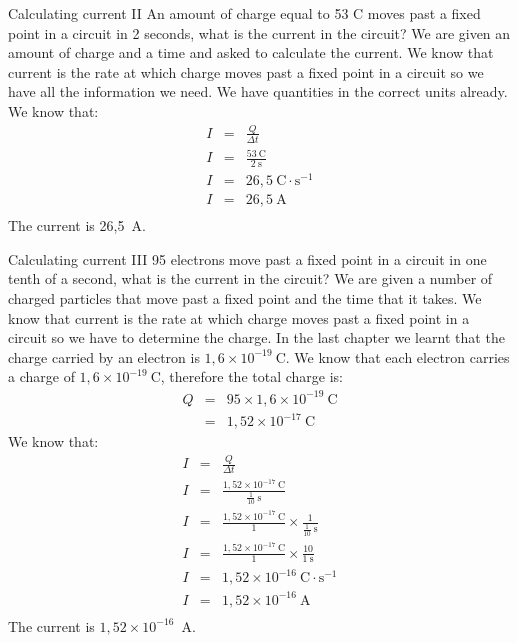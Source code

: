 \begin{wex}{Calculating current II}
{An amount of charge equal to 53 C moves past a fixed point in a circuit in 2 seconds, what is the current in the circuit?
}{%
We are given an amount of charge and a time and asked to calculate the current. We know that current is the rate at which charge moves past a fixed point in a circuit so we have all the information we need. We have quantities in the correct units already.
We know that:
\begin{eqnarray*}
I &=& \frac{Q}{\Delta t} \\
I &=& \frac{53~\text{C}}{2~\text{s}} \\
I &=& 26,5~\text{C} \cdot \text{s}^{-1} \\
I &=& 26,5~\text{A} \\
\end{eqnarray*}
The current is 26,5~A.
}
\end{wex}

\begin{wex}{Calculating current III}
{95 electrons move past a fixed point in a circuit in one tenth of a second, what is the current in the circuit?
}{%
We are given a number of charged particles that move past a fixed point and the time that it takes.
We know that current is the rate at which charge moves past a fixed point in a circuit so we have to determine the 
charge. In the last chapter we learnt that the charge carried by an electron is $1,6\times10^{-19}~\text{C}$.
We know that each electron carries a charge of $1,6\times10^{-19}~\text{C}$, therefore the total charge is:
\begin{eqnarray*}
Q & = & 95 \times 1,6\times10^{-19}~\text{C} \\
& = & 1,52\times10^{-17}~\text{C} 
\end{eqnarray*}
We know that:
\begin{eqnarray*}
I &=& \frac{Q}{\Delta t} \\
I &=& \frac{1,52\times10^{-17}~\text{C}}{\frac{1}{10}~\text{s}} \\
I &=& \frac{1,52\times10^{-17}~\text{C}}{1}\times{\frac{1}{{\frac{1}{10}~\text{s}}}} \\
I &=& \frac{1,52\times10^{-17}~\text{C}}{1}\times\frac{10}{1~\text{s}} \\
I &=& 1,52\times10^{-16}~\text{C} \cdot \text{s}^{-1} \\
I &=& 1,52\times10^{-16}~\text{A} \\
\end{eqnarray*}
The current is $1,52\times10^{-16}$~A.
}
\end{wex}


